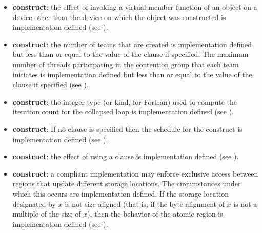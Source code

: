 \begin{itemize}
\item {} \textbf{construct}: the effect of invoking a virtual member
function of an object on a device other than the device on which the object was
constructed is implementation defined (see ).

\item {} \textbf{construct}: the number of teams that are created is implementation defined but 
less than or equal to the value of the  clause if specified. The maximum 
number of threads participating in the contention group that each team initiates is 
implementation defined but less than or equal to the value of the  
clause if specified (see ). 

\item {} \textbf{construct}: the integer type (or kind, for
    Fortran) used to compute the iteration count for the collapsed loop is
    implementation defined (see ). 

\item {} \textbf{construct}: If no  clause is specified then the schedule for the  
construct is implementation defined (see ). 

\item {} \textbf{construct}: the effect of using a 
clause is implementation defined (see ). 

\item {} \textbf{construct}: a compliant implementation may enforce exclusive access 
between  regions that update different storage locations. The circumstances 
under which this occurs are implementation defined. If the storage location 
designated by $x$ is not size-aligned (that is, if the byte alignment of $x$ is not a multiple 
of the size of $x$), then the behavior of the atomic region is implementation defined 
(see ).

\end{itemize}

